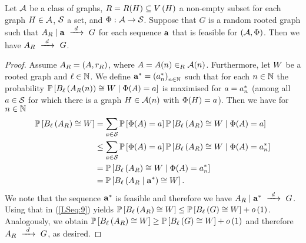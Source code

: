 \begin{lem}\label{LSlem:conditional}
Let $\mathcal{A}$ be a class of graphs, $R=R(H)\subseteq V\left(H\right)$ a non-empty subset for each graph $H\in\mathcal{A}$, $\mathcal{S}$ a set, and $\Phi:\mathcal{A}\to \mathcal{S}$. Suppose that $G$ is a random rooted graph such that $A_{R} \mid \mathbf{a}~\xrightarrow{~d~}~G$ for each sequence $\mathbf{a}$ that is feasible for $\left(\mathcal{A}, \Phi\right)$. Then we have $A_{R}~\xrightarrow{~d~}~G$.
\end{lem}
\begin{proof}
Assume $A_{R}=\left(A, r_{R}\right)$, where $A=A(n)\in_R\mathcal{A}(n)$. Furthermore, let $W$ be a rooted graph and $\ell\in\mathbb{N}$. We define $\mathbf{a}^\ast=\left(a_n^\ast\right)_{n\in\mathbb{N}}$ such that for each $n\in \mathbb{N}$ the probability $\mathbb{P}\left[B_{\ell}\left(A_{R}(n)\right)\cong W \;\middle|\; \Phi(A)=a\right]$ is maximised for $a=a_n^\ast$ (among all $a\in \mathcal{S}$ for which there is a graph $H\in\mathcal{A}(n)$ with $\Phi(H)=a$). Then we have for $n\in\mathbb{N}$
\begin{align}\label{LSeq:9}
\mathbb{P}\left[B_{\ell}\left(A_{R}\right)\cong W\right]&=\sum_{a\in \mathcal{S}}\mathbb{P}\left[\Phi(A)=a\right]\mathbb{P}\left[B_{\ell}\left(A_{R}\right)\cong W \;\middle|\; \Phi(A)=a\right]\nonumber
\\
&
\leq\sum_{a\in \mathcal{S}}\mathbb{P}\left[\Phi(A)=a\right]\mathbb{P}\left[B_{\ell}\left(A_{R}\right)\cong W \;\middle|\; \Phi(A)=a_n^\ast\right]\nonumber
\\
&
=\mathbb{P}\left[B_{\ell}\left(A_{R}\right)\cong W \;\middle|\; \Phi(A)=a_n^\ast\right]\nonumber
\\
&
=\mathbb{P}\left[B_{\ell}\left(A_{R} \mid \mathbf{a}^\ast\right)\cong W\right].
\end{align}
We note that the sequence $\mathbf{a}^\ast$ is feasible and therefore we have $A_{R} \mid \mathbf{a}^\ast~\xrightarrow{~d~}~G$. Using that in (\ref{LSeq:9}) yields $\mathbb{P}\left[B_{\ell}\left(A_{R}\right)\cong W\right]\leq\mathbb{P}\left[B_{\ell}\left(G\right)\cong W\right]+o\left(1\right)$. Analogously, we obtain $\mathbb{P}\left[B_{\ell}\left(A_{R}\right)\cong W\right]\geq \mathbb{P}\left[B_{\ell}\left(G\right)\cong W\right]+o\left(1\right)$ and therefore $A_{R}~\xrightarrow{~d~}~G$, as desired.
\end{proof}

